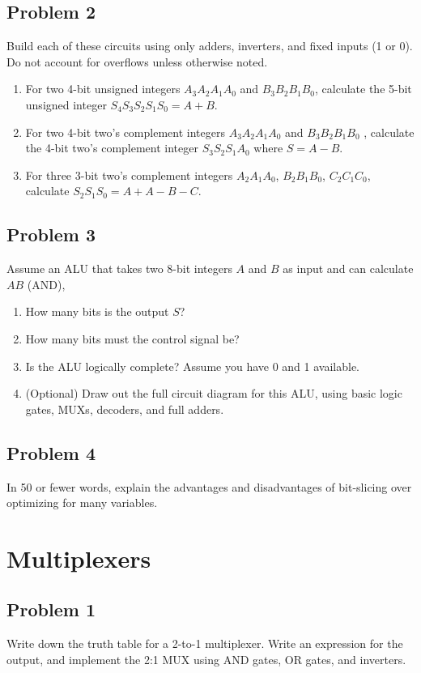 \documentclass{article}
\begin{document}
\subsection*{Problem 2}
Build each of these circuits using only adders, inverters, and fixed inputs (1 or 0). Do not account for overflows unless otherwise noted.
\begin{enumerate}[label=\alph*.]
    \item For two 4-bit unsigned integers $A_3A_2A_1A_0$ and $B_3B_2B_1B_0$, calculate the 5-bit unsigned integer $S_4S_3S_2S_1S_0 = A + B$. 
    \item For two 4-bit two's complement integers $A_3A_2A_1A_0$ and $B_3B_2B_1B_0$ , calculate the 4-bit two's complement integer $S_3S_2S_1A_0$ where $S=A-B$.
    \item For three 3-bit two's complement integers $A_2A_1A_0$, $B_2B_1B_0$, $C_2C_1C_0$, calculate $S_2S_1S_0=A+A-B-C$.
\end{enumerate}


\subsection*{Problem 3}
Assume an ALU that takes two 8-bit integers $A$ and $B$ as input and can calculate $AB$ (AND), 
\begin{enumerate}[label=\alph*.]
    \item How many bits is the output $S$?
    \item How many bits must the control signal be? 
    \item Is the ALU logically complete? Assume you have 0 and 1 available.
    \item (Optional) Draw out the full circuit diagram for this ALU, using basic logic gates, MUXs, decoders, and full adders.
\end{enumerate}


\subsection*{Problem 4}
In 50 or fewer words, explain the advantages and disadvantages of bit-slicing over optimizing for many variables.

\newpage
\section*{Multiplexers}
\subsection*{Problem 1}
Write down the truth table for a 2-to-1 multiplexer. Write an expression for the output, and implement the 2:1 MUX using AND gates, OR gates, and inverters.
\end{document}
